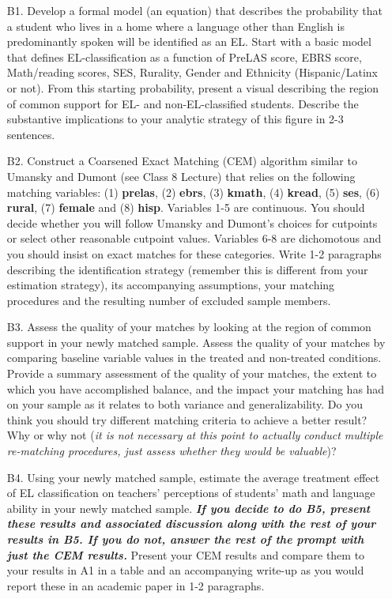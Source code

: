 \documentclass[a4paper, 11pt]{article}
\begin{document}
\begin{enumerate}
	\item[B1.] Develop a formal model (an equation) that describes the probability that a student who lives in a home where a language other than English is predominantly spoken will be identified as an EL. Start with a basic model that defines EL-classification as a function of PreLAS score, EBRS score, Math/reading scores, SES, Rurality, Gender and Ethnicity (Hispanic/Latinx or not). From this starting probability, present a visual describing the region of common support for EL- and non-EL-classified students. Describe the substantive implications to your analytic strategy of this figure in 2-3 sentences.
	\item[B2.] Construct a Coarsened Exact Matching (CEM) algorithm similar to Umansky and Dumont (see Class 8 Lecture) that relies on the following matching variables: (1) \textbf{prelas}, (2) \textbf{ebrs}, (3) \textbf{kmath}, (4) \textbf{kread}, (5) \textbf{ses}, (6) \textbf{rural}, (7) \textbf{female} and (8) \textbf{hisp}. Variables 1-5 are continuous. You should decide whether you will follow Umansky and Dumont's choices for cutpoints or select other reasonable cutpoint values. Variables 6-8 are dichomotous and you should insist on exact matches for these categories. Write 1-2 paragraphs describing the identification strategy (remember this is different from your estimation strategy), its accompanying assumptions, your matching procedures and the resulting number of excluded sample members.
	\item[B3.] Assess the quality of your matches by looking at the region of common support in your newly matched sample. Assess the quality of your matches by comparing baseline variable values in the treated and non-treated conditions. Provide a summary assessment of the quality of your matches, the extent to which you have accomplished balance, and the impact your matching has had on your sample as it relates to both variance and generalizability. Do you think you should try different matching criteria to achieve a better result? Why or why not (\textit{it is not necessary at this point to actually conduct multiple re-matching procedures, just assess whether they would be valuable})?
	\item[B4.] Using your newly matched sample, estimate the average treatment effect of EL classification on teachers' perceptions of students' math and language ability in your newly matched sample. \textbf{\textit{If you decide to do B5, present these results and associated discussion along with the rest of your results in B5. If you do not, answer the rest of the prompt with just the CEM results.}} Present your CEM results and compare them to your results in A1 in a table and an accompanying write-up as you would report these in an academic paper in 1-2 paragraphs. 

\end{enumerate}
\end{document}
